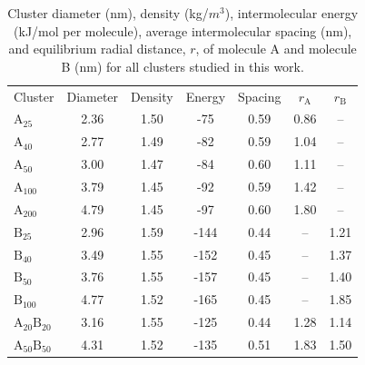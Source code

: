 %
\begin{table}[ht]
\centering
\caption{Cluster diameter (nm), density (kg/$m^3$), intermolecular energy (kJ/mol per molecule), average intermolecular spacing (nm), and equilibrium radial distance, $r$, of molecule A and molecule B (nm) for all clusters studied in this work.} %
\label{table:maintable}
\begin{tabular}{lcccccc}
\hline
\multicolumn{1}{l}{\multirow{2}{*}{Cluster}} & \multicolumn{1}{c}{\multirow{2}{*}{Diameter}} & \multicolumn{1}{c}{\multirow{2}{*}{Density}} & \multicolumn{1}{c}{\multirow{2}{*}{Energy}} & \multicolumn{1}{c}{\multirow{2}{*}{Spacing}} & \multicolumn{1}{c}{\multirow{2}{*}{$r_{\text{A}}$}} & 
\multicolumn{1}{c}{\multirow{2}{*}{$r_{\text{B}}$}} \\ 
\multicolumn{1}{c}{} & \multicolumn{1}{c}{} & \multicolumn{1}{c}{} & \multicolumn{1}{c}{} & \multicolumn{1}{c}{} & \multicolumn{1}{c}{} & \multicolumn{1}{c}{} \\ \hline
$\text{A}_{\text{25}}$ & 2.36 & 1.50 & -75 & 0.59 &  \multicolumn{1}{c}{0.86} & -- \\
$\text{A}_{\text{40}}$ & 2.77 & 1.49 & -82 & 0.59 &  \multicolumn{1}{c}{1.04} & -- \\
$\text{A}_{\text{50}}$ & 3.00 & 1.47 & -84 & 0.60 &  \multicolumn{1}{c}{1.11} & -- \\
$\text{A}_{\text{100}}$ & 3.79 & 1.45 & -92 & 0.59 &  \multicolumn{1}{c}{1.42} & -- \\
$\text{A}_{\text{200}}$ & 4.79 & 1.45 & -97 & 0.60 &  \multicolumn{1}{c}{1.80} & -- \\ \hline
$\text{B}_{\text{25}}$ & 2.96 & 1.59 & -144 & 0.44 &  \multicolumn{1}{c}{--} & 1.21 \\
$\text{B}_{\text{40}}$ & 3.49 & 1.55 & -152 & 0.45 &  \multicolumn{1}{c}{--} & 1.37 \\
$\text{B}_{\text{50}}$ & 3.76 & 1.55 & -157 & 0.45 &  \multicolumn{1}{c}{--} & 1.40 \\
$\text{B}_{\text{100}}$ & 4.77 & 1.52 & -165 & 0.45 &  \multicolumn{1}{c}{--} & 1.85 \\ \hline
$\text{A}_{\text{20}}\text{B}_{\text{20}}$ & 3.16 & 1.55 & -125 & 0.44 &  \multicolumn{1}{c}{1.28} & 1.14 \\
$\text{A}_{\text{50}}\text{B}_{\text{50}}$ & 4.31 & 1.52 & -135 & 0.51 &  \multicolumn{1}{c}{1.83} & 1.50 \\

\end{tabular}
\end{table}
